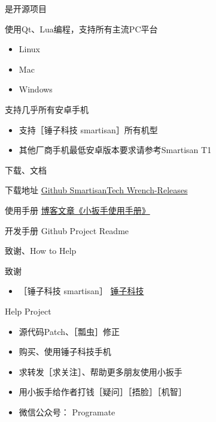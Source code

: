 \documentclass[presentation,dvipdfmx,CJKbookmarks]{beamer}
\begin{document}
\begin{CJK*}{UTF8}{simsun}
\begin{frame}[label={sec:org4a60009}]{是开源项目}
\begin{block}{使用\thinspace Qt、Lua\thinspace 编程，支持所有主流\thinspace PC\thinspace 平台}
\begin{itemize}
\item Linux
\item Mac
\item Windows
\end{itemize}
\end{block}

\begin{block}{支持几乎所有安卓手机}
\begin{itemize}
\item 支持［锤子科技 smartisan］所有机型
\item 其他厂商手机最低安卓版本要求请参考\thinspace Smartisan T1
\end{itemize}
\end{block}
\end{frame}

\begin{frame}[label={sec:org3042fe3}]{下载、文档}
\begin{block}{下载地址}
\href{https://github.com/SmartisanTech/Wrench-releases/releases}{Github SmartisanTech Wrench-Releases}
\end{block}

\begin{block}{使用手册}
\href{http://baohaojun.github.io/blog/2014/12/01/0-T1Wrench-2.0-Usage-Guide.html}{博客文章《小扳手使用手册》}
\end{block}

\begin{block}{开发手册}
Github Project Readme
\end{block}
\end{frame}

\begin{frame}[label={sec:orga2ce8e3}]{致谢、How to Help}
\begin{block}{致谢}
\begin{itemize}
\item ［锤子科技 smartisan］ \href{http://www.smartisan.com/cn/}{锤子科技}
\end{itemize}
\end{block}
\begin{block}{Help  Project}
\begin{itemize}
\item 源代码\thinspace Patch、［瓢虫］修正
\item 购买、使用锤子科技手机
\item 求转发［求关注］、帮助更多朋友使用小扳手
\item 用小扳手给作者打钱［疑问］［捂脸］［机智］
\item 微信公众号： Programate
\end{itemize}
\end{block}
\end{frame}


\end{CJK*}
\end{document}
